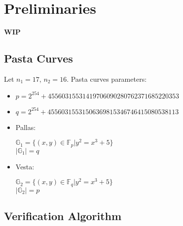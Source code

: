 \section{Preliminaries}
\label{section:preliminaries}
\textbf{WIP}
\subsection{Pasta Curves}

Let $n_1 = 17$, $n_2 = 16$.
Pasta curves parameters:
\begin{itemize}
	\item $p = 2^254 + 45560315531419706090280762371685220353$
	\item $q = 2^254 + 45560315531506369815346746415080538113$
	\item Pallas:
		\begin{center}
			$\mathbb{G}_1 = \{ (x, y) \in \mathbb{F}_p | y^2 = x^3 + 5 \}$ \\
			$|\mathbb{G}_1| = q$
		\end{center}
	\item Vesta:
		\begin{center}
			$\mathbb{G}_2 = \{ (x, y) \in \mathbb{F}_q | y^2 = x^3 + 5 \}$ \\
			$|\mathbb{G}_2| = p$
		\end{center}
\end{itemize}

\subsection{Verification Algorithm}

